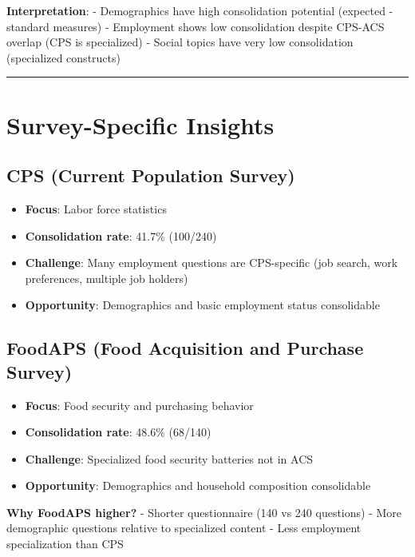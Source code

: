 \documentclass[
  letterpaper,
]{report}
\providecommand{\tightlist}{%
  \setlength{\itemsep}{0pt}\setlength{\parskip}{0pt}}
\begin{document}
\textbf{Interpretation}: - Demographics have high consolidation
potential (expected - standard measures) - Employment shows low
consolidation despite CPS-ACS overlap (CPS is specialized) - Social
topics have very low consolidation (specialized constructs)

\begin{center}\rule{0.5\linewidth}{0.5pt}\end{center}

\section{Survey-Specific Insights}\label{survey-specific-insights}

\subsection{CPS (Current Population
Survey)}\label{cps-current-population-survey}

\begin{itemize}
\tightlist
\item
  \textbf{Focus}: Labor force statistics
\item
  \textbf{Consolidation rate}: 41.7\% (100/240)
\item
  \textbf{Challenge}: Many employment questions are CPS-specific (job
  search, work preferences, multiple job holders)
\item
  \textbf{Opportunity}: Demographics and basic employment status
  consolidable
\end{itemize}

\subsection{FoodAPS (Food Acquisition and Purchase
Survey)}\label{foodaps-food-acquisition-and-purchase-survey}

\begin{itemize}
\tightlist
\item
  \textbf{Focus}: Food security and purchasing behavior
\item
  \textbf{Consolidation rate}: 48.6\% (68/140)
\item
  \textbf{Challenge}: Specialized food security batteries not in ACS
\item
  \textbf{Opportunity}: Demographics and household composition
  consolidable
\end{itemize}

\textbf{Why FoodAPS higher?} - Shorter questionnaire (140 vs 240
questions) - More demographic questions relative to specialized content
- Less employment specialization than CPS
\end{document}
